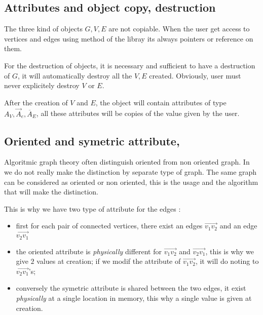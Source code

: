 
\subsection{Attributes and object copy, destruction}

The three kind of objects $G,V,E$ are not copiable. When the user get access
to vertices and edges  using method of the libray its always pointers or reference
on them. 

For the destruction of objects, it is necessary and sufficient to have a destruction
of $G$, it will automatically destroy all the $V,E$ created.  Obviously,  user must never
explicitely destroy $V$ or $E$.

After the creation of $V$ and $E$, the object will contain attributes  of type $A_V,\vec{A}_e,\overline{A}_E$,
all these attributes will be copies of the value given by the user.


\subsection{Oriented and symetric attribute,}

\label{Gr:Attr:SymOr}

Algoritmic graph theory often distinguish oriented from non oriented graph.  In \PPP  we
do not really make the distinction by separate type of graph.  The same
graph can be considered as oriented or non oriented, this is the usage
and the algorithm that will make the distinction.

This is why we have two type of attribute for the edges : 

\begin{itemize}
   \item first for each pair of connected vertices, there exist an edges $\overrightarrow{v_1v_2}$
         and an edge $\overrightarrow{v_2v_1}$

   \item the oriented attribute is \emph{physically} different for $\overrightarrow{v_1v_2}$
         and $\overrightarrow{v_2v_1}$,  this is why we give $2$ values at creation;  if we
         modif the attribute of  $\overrightarrow{v_1v_2}$, it will do noting to  $\overrightarrow{v_2v_1}$'s;

   \item conversely the symetric attribute is   shared between the two edges, it exist
         \emph{physically} at a single location in memory,  this why a single value is given at creation.
  
\end{itemize}

